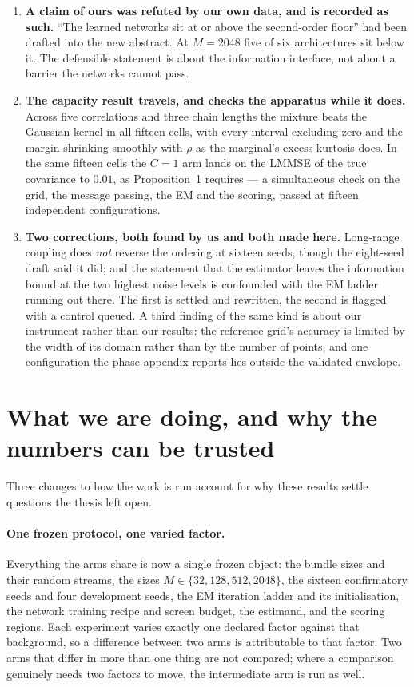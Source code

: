 \documentclass[11pt,a4paper]{article}
\newcommand{\hi}[1]{\textbf{#1}}
\begin{document}
\begin{enumerate}
\item \hi{A claim of ours was refuted by our own data, and is recorded as such.} ``The learned
networks sit at or above the second-order floor'' had been drafted into the new abstract. At
$M=2048$ five of six architectures sit below it. The defensible statement is about the information
interface, not about a barrier the networks cannot pass.

\item \hi{The capacity result travels, and checks the apparatus while it does.} Across five
correlations and three chain lengths the mixture beats the Gaussian kernel in all fifteen cells,
with every interval excluding zero and the margin shrinking smoothly with $\rho$ as the marginal's
excess kurtosis does. In the same fifteen cells the $C=1$ arm lands on the LMMSE of the true
covariance to $0.01$, as Proposition~1 requires --- a simultaneous check on the grid, the message
passing, the EM and the scoring, passed at fifteen independent configurations.

\item \hi{Two corrections, both found by us and both made here.} Long-range coupling does
\emph{not} reverse the ordering at sixteen seeds, though the eight-seed draft said it did; and
the statement that the estimator leaves the information bound at the two highest noise levels is
confounded with the EM ladder running out there. The first is settled and rewritten, the second is
flagged with a control queued. A third finding of the same kind is about our instrument rather
than our results: the reference grid's accuracy is limited by the width of its domain rather than
by the number of points, and one configuration the phase appendix reports lies outside the
validated envelope.
\end{enumerate}

\section{What we are doing, and why the numbers can be trusted}\label{sec:method}

Three changes to how the work is run account for why these results settle questions the thesis
left open.

\paragraph{One frozen protocol, one varied factor.}
Everything the arms share is now a single frozen object: the bundle sizes and their random
streams, the sizes $M\in\{32,128,512,2048\}$, the sixteen confirmatory seeds and four development
seeds, the EM iteration ladder and its initialisation, the network training recipe and screen
budget, the estimand, and the scoring regions. Each experiment varies exactly one declared factor
against that background, so a difference between two arms is attributable to that factor. Two arms
that differ in more than one thing are not compared; where a comparison genuinely needs two
factors to move, the intermediate arm is run as well.
\end{document}
